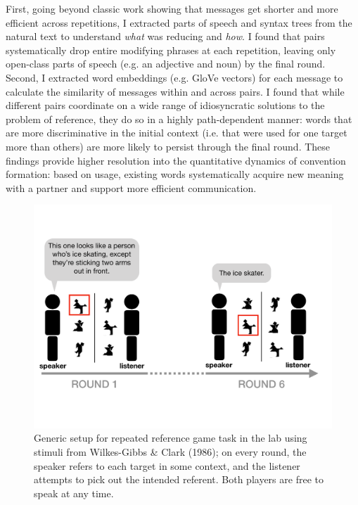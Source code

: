 \documentclass[11pt]{article}
\begin{document}
First, going beyond classic work showing that messages get shorter and more efficient across repetitions, I extracted parts of speech and syntax trees from the natural text to understand \emph{what} was reducing and \emph{how}.
I found that pairs systematically drop entire modifying phrases at each repetition, leaving only open-class parts of speech (e.g. an adjective and noun) by the final round. 
Second, I extracted word embeddings (e.g. GloVe vectors) for each message to calculate the similarity of messages within and across pairs. 
I found that while different pairs coordinate on a wide range of idiosyncratic solutions to the problem of reference, they do so in a highly path-dependent manner: words that are more discriminative in the initial context (i.e. that were used for one target more than others) are more likely to persist through the final round.
These findings provide higher resolution into the quantitative dynamics of convention formation: based on usage, existing words systematically acquire new meaning with a partner and support more efficient communication.

\begin{figure}[t]
\centering
\includegraphics[scale=.45]{task_cropped.pdf}
\caption{Generic setup for repeated reference game task in the lab using stimuli from Wilkes-Gibbs \& Clark (1986); on every round, the speaker refers to each target in some context, and the listener attempts to pick out the intended referent. Both players are free to speak at any time.}
\label{fig:tangramsmethods}
\end{figure}
\end{document}
